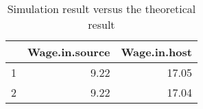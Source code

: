 \begin{table}[ht]
\centering
\begin{tabular}{rrr}
  \hline
 & Wage.in.source & Wage.in.host \\ 
  \hline
1 & 9.22 & 17.05 \\ 
  2 & 9.22 & 17.04 \\ 
   \hline
\end{tabular}
\caption{Simulation result versus the theoretical result} 
\label{tab:sim_res}
\end{table}
